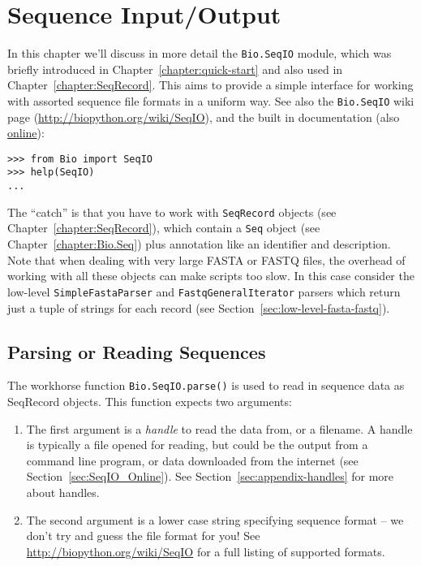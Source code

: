 \chapter{Sequence Input/Output}
\label{chapter:Bio.SeqIO}

In this chapter we'll discuss in more detail the \verb|Bio.SeqIO| module, which was briefly introduced in Chapter~\ref{chapter:quick-start} and also used in Chapter~\ref{chapter:SeqRecord}. This aims to provide a simple interface for working with assorted sequence file formats in a uniform way.
See also the \verb|Bio.SeqIO| wiki page (\url{http://biopython.org/wiki/SeqIO}), and the built in documentation (also \href{http://biopython.org/DIST/docs/api/Bio.SeqIO-module.html}{online}):

\begin{verbatim}
>>> from Bio import SeqIO
>>> help(SeqIO)
...
\end{verbatim}

The ``catch'' is that you have to work with \verb|SeqRecord| objects (see Chapter~\ref{chapter:SeqRecord}), which contain a \verb|Seq| object (see Chapter~\ref{chapter:Bio.Seq}) plus annotation like an identifier and description.
Note that when dealing with very large FASTA or FASTQ files, the overhead of working with all these objects can make scripts too slow.
In this case consider the low-level \verb|SimpleFastaParser| and \verb|FastqGeneralIterator| parsers which return just a tuple of strings for each record (see Section~\ref{sec:low-level-fasta-fastq}).

\section{Parsing or Reading Sequences}
\label{sec:Bio.SeqIO-input}

The workhorse function \verb|Bio.SeqIO.parse()| is used to read in sequence data as SeqRecord objects.  This function expects two arguments:

\begin{enumerate}
\item The first argument is a {\it handle} to read the data from, or a filename. A handle is typically a file opened for reading, but could be the output from a command line program, or data downloaded from the internet (see Section~\ref{sec:SeqIO_Online}).  See Section~\ref{sec:appendix-handles} for more about handles.
\item The second argument is a lower case string specifying sequence format -- we don't try and guess the file format for you!  See \url{http://biopython.org/wiki/SeqIO} for a full listing of supported formats.
\end{enumerate}

